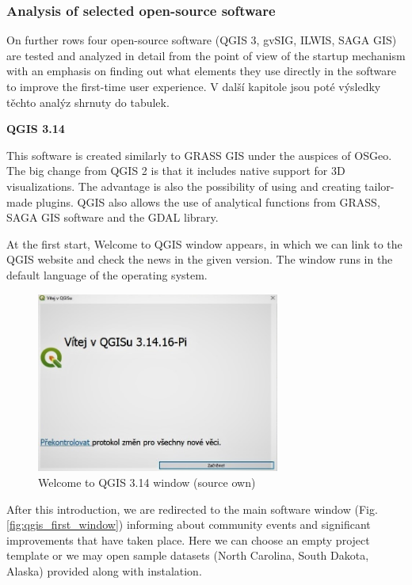 \documentclass[a4paper,10pt,twoside]{article}
\begin{document}
\newpage
\vspace*{-1cm}
\subsubsection{Analysis of selected open-source software}

\noindent On further rows four open-source software (QGIS 3, gvSIG, ILWIS, SAGA GIS) are tested and analyzed in detail from the point of view of the startup mechanism with an emphasis on finding out what elements they use directly in the software to improve the first-time user experience. V další kapitole jsou poté výsledky těchto analýz shrnuty do tabulek. 

\bigskip

\noindent \textbf {QGIS 3.14}

\noindent This software is created similarly to GRASS GIS under the auspices of OSGeo. The big change from QGIS 2 is that it includes native support for 3D visualizations. The advantage is also the possibility of using and creating tailor-made plugins. QGIS also allows the use of analytical functions from GRASS, SAGA GIS software and the GDAL library. 

At the first start, Welcome to QGIS window appears, in which we can link to the QGIS website and check the news in the given version. The window runs in the default language of the operating system.

\vspace{0.3cm}
\begin{figure}[hbt!] 
\begin{center}
\includegraphics[width=8cm]{../pictures/qgis_startup_window.JPG} 
\caption[Welcome to QGIS 3.14 window (source own)]{Welcome to QGIS 3.14 window (source own)}
\label{fig:qgis_startup_window}
\end{center}
\end{figure}

\noindent After this introduction, we are redirected to the main software window (Fig. \ref{fig:qgis_first_window})  informing about community events and significant improvements that have taken place. Here we can choose an empty project template or we may open sample datasets (North Carolina, South Dakota, Alaska) provided along with instalation.
\end{document}
